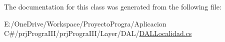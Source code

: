 The documentation for this class was generated from the following file\+:\begin{DoxyCompactItemize}
\item 
E\+:/\+One\+Drive/\+Workspace/\+Proyecto\+Progra/\+Aplicacion C\#/prj\+Progra\+I\+I\+I/prj\+Progra\+I\+I\+I/\+Layer/\+D\+A\+L/\hyperlink{_d_a_l_localidad_8cs}{D\+A\+L\+Localidad.\+cs}\end{DoxyCompactItemize}
